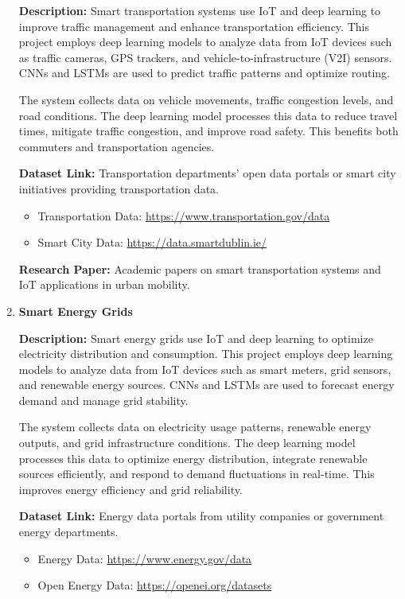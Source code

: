\documentclass{article}
\begin{document}
\begin{enumerate}[label=\textbf{\arabic*.}, leftmargin=*]
\textbf{Description:}
Smart transportation systems use IoT and deep learning to improve traffic management and enhance transportation efficiency. This project employs deep learning models to analyze data from IoT devices such as traffic cameras, GPS trackers, and vehicle-to-infrastructure (V2I) sensors. CNNs and LSTMs are used to predict traffic patterns and optimize routing.

The system collects data on vehicle movements, traffic congestion levels, and road conditions. The deep learning model processes this data to reduce travel times, mitigate traffic congestion, and improve road safety. This benefits both commuters and transportation agencies.

\textbf{Dataset Link:} Transportation departments' open data portals or smart city initiatives providing transportation data.
\begin{itemize}
    \item Transportation Data: \url{https://www.transportation.gov/data}
    \item Smart City Data: \url{https://data.smartdublin.ie/}
\end{itemize}

\textbf{Research Paper:} Academic papers on smart transportation systems and IoT applications in urban mobility.

\item \textbf{Smart Energy Grids}

\textbf{Description:}
Smart energy grids use IoT and deep learning to optimize electricity distribution and consumption. This project employs deep learning models to analyze data from IoT devices such as smart meters, grid sensors, and renewable energy sources. CNNs and LSTMs are used to forecast energy demand and manage grid stability.

The system collects data on electricity usage patterns, renewable energy outputs, and grid infrastructure conditions. The deep learning model processes this data to optimize energy distribution, integrate renewable sources efficiently, and respond to demand fluctuations in real-time. This improves energy efficiency and grid reliability.

\textbf{Dataset Link:} Energy data portals from utility companies or government energy departments.
\begin{itemize}
    \item Energy Data: \url{https://www.energy.gov/data}
    \item Open Energy Data: \url{https://openei.org/datasets}
\end{itemize}


\end{enumerate}
\end{document}
